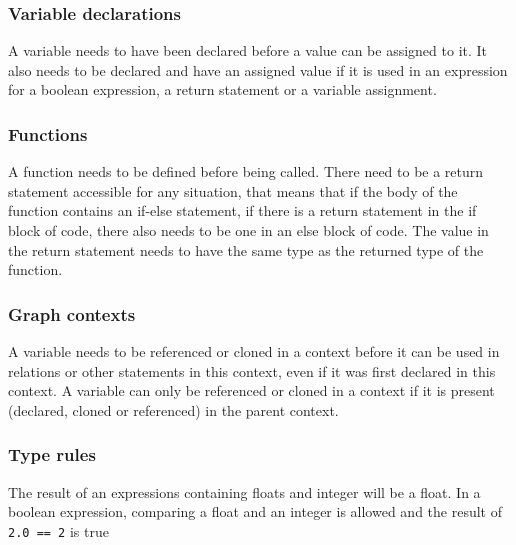 \subsubsection*{Variable declarations}

A variable needs to have been declared before a value can be assigned to it.
It also needs to be declared and have an assigned value if it is used in an expression for a boolean expression, a return statement or a variable assignment.

\subsubsection*{Functions}

A function needs to be defined before being called.
There need to be a return statement accessible for any situation, that means that if the body of the function contains an if-else statement, if there is a return statement in the if block of code, there also needs to be one in an else block of code.
The value in the return statement needs to have the same type as the returned type of the function. %

\subsubsection*{Graph contexts}

A variable needs to be referenced or cloned in a context before it can be used in relations or other statements in this context, even if it was first declared in this context.
A variable can only be referenced or cloned in a context if it is present (declared, cloned or referenced) in the parent context.

\subsubsection*{Type rules}

The result of an expressions containing floats and integer will be a float.
In a boolean expression, comparing a float and an integer is allowed and the result of \texttt{2.0 == 2} is true